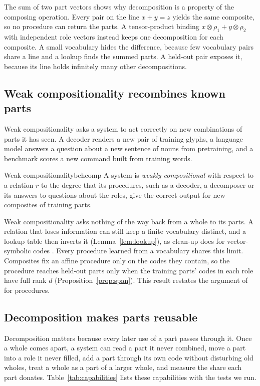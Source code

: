 The sum of two part vectors shows why decomposition is a property of the composing operation. Every pair on the line $x + y = z$ yields the same composite, so no procedure can return the parts. A tensor-product binding $x \otimes \rho_1 + y \otimes \rho_2$ with independent role vectors \citep{smolensky1990} instead keeps one decomposition for each composite. A small vocabulary hides the difference, because few vocabulary pairs share a line and a lookup finds the summed parts. A held-out pair exposes it, because its line holds infinitely many other decompositions.

\subsection{Weak compositionality recombines known parts}
\label{sec:notions}

Weak compositionality asks a system to act correctly on new combinations of parts it has seen. A decoder renders a new pair of training glyphs, a language model answers a question about a new sentence of nouns from pretraining, and a benchmark scores a new command built from training words.

\begin{defbox}{Weak compositionality}{behcomp}
A system is \emph{weakly compositional} with respect to a relation $r$ to the degree that its procedures, such as a decoder, a decomposer or its answers to questions about the roles, give the correct output for new composites of training parts.
\end{defbox}

Weak compositionality asks nothing of the way back from a whole to its parts. A relation that loses information can still keep a finite vocabulary distinct, and a lookup table then inverts it (Lemma~\ref{lem:lookup}), as clean-up does for vector-symbolic codes \citep{plate1995}. Every procedure learned from a vocabulary shares this limit. Composites fix an affine procedure only on the codes they contain, so the procedure reaches held-out parts only when the training parts' codes in each role have full rank $d$ (Proposition~\ref{prop:span}). This result restates the argument of \citet{marcus1998} for procedures.

\subsection{Decomposition makes parts reusable}
\label{sec:decomposition}

Decomposition matters because every later use of a part passes through it. Once a whole comes apart, a system can read a part it never combined, move a part into a role it never filled, add a part through its own code without disturbing old wholes, treat a whole as a part of a larger whole, and measure the share each part donates. Table~\ref{tab:capabilities} lists these capabilities with the tests we run.

